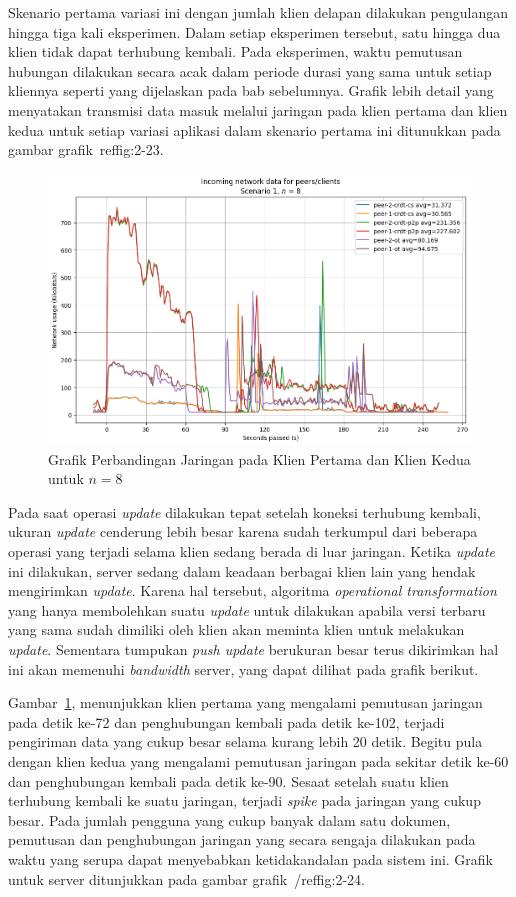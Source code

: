 Skenario pertama variasi ini dengan jumlah klien delapan dilakukan pengulangan hingga tiga kali eksperimen. Dalam setiap eksperimen tersebut, satu hingga dua klien tidak dapat terhubung kembali. Pada eksperimen, waktu pemutusan hubungan dilakukan secara acak dalam periode durasi yang sama untuk setiap kliennya seperti yang dijelaskan pada bab sebelumnya. Grafik lebih detail yang menyatakan transmisi data masuk melalui jaringan pada klien pertama dan klien kedua untuk setiap variasi aplikasi dalam skenario pertama ini ditunukkan pada gambar grafik~ref{fig:2-23}.

\begin{figure}
 \centering
 \includegraphics[width=13cm]{./assets/skripsi/benchmark-vis_cell_2_output_23}
 \caption{Grafik Perbandingan Jaringan pada Klien Pertama dan Klien Kedua untuk $n = 8$}
 \label{fig:2-23}
\end{figure}

Pada saat operasi \textit{update} dilakukan tepat setelah koneksi terhubung kembali, ukuran \textit{update} cenderung lebih besar karena sudah terkumpul dari beberapa operasi yang terjadi selama klien sedang berada di luar jaringan. Ketika \textit{update} ini dilakukan, server sedang dalam keadaan berbagai klien lain yang hendak mengirimkan \textit{update}. Karena hal tersebut, algoritma \textit{operational transformation} yang hanya membolehkan suatu \textit{update} untuk dilakukan apabila versi terbaru yang sama sudah dimiliki oleh klien akan meminta klien untuk melakukan \textit{update}. Sementara tumpukan \textit{push update} berukuran besar terus dikirimkan hal ini akan memenuhi \textit{bandwidth} server, yang dapat dilihat pada grafik berikut.

Gambar~\ref{fig:2-23}, menunjukkan klien pertama yang mengalami pemutusan jaringan pada detik ke-72 dan penghubungan kembali pada detik ke-102, terjadi pengiriman data yang cukup besar selama kurang lebih 20 detik. Begitu pula dengan klien kedua yang mengalami pemutusan jaringan pada sekitar detik ke-60 dan penghubungan kembali pada detik ke-90. Sesaat setelah suatu klien terhubung kembali ke suatu jaringan, terjadi \textit{spike} pada jaringan yang cukup besar. Pada jumlah pengguna yang cukup banyak dalam satu dokumen, pemutusan dan penghubungan jaringan yang secara sengaja dilakukan pada waktu yang serupa dapat menyebabkan ketidakandalan pada sistem ini. Grafik untuk server ditunjukkan pada gambar grafik~/ref{fig:2-24}.

